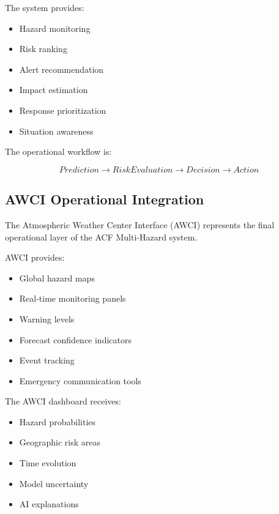 The system provides:

\begin{itemize}

\item Hazard monitoring

\item Risk ranking

\item Alert recommendation

\item Impact estimation

\item Response prioritization

\item Situation awareness

\end{itemize}


The operational workflow is:

\[
Prediction
\rightarrow
Risk Evaluation
\rightarrow
Decision
\rightarrow
Action
\]


\subsection{AWCI Operational Integration}

The Atmospheric Weather Center Interface (AWCI) represents the final
operational layer of the ACF Multi-Hazard system.

AWCI provides:

\begin{itemize}

\item Global hazard maps

\item Real-time monitoring panels

\item Warning levels

\item Forecast confidence indicators

\item Event tracking

\item Emergency communication tools

\end{itemize}


The AWCI dashboard receives:

\begin{itemize}

\item Hazard probabilities

\item Geographic risk areas

\item Time evolution

\item Model uncertainty

\item AI explanations

\end{itemize}

